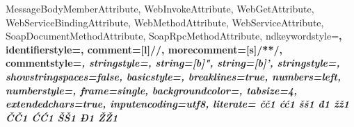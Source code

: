 {{        MessageBodyMemberAttribute, WebInvokeAttribute, WebGetAttribute, WebServiceBindingAttribute,
        WebMethodAttribute, WebServiceAttribute, SoapDocumentMethodAttribute, SoapRpcMethodAttribute},
    ndkeywordstyle=\color{magenta}\bfseries,
    identifierstyle=\color{black},
    comment=[l]{//},
    morecomment=[s]{/*}{*/},
    commentstyle=\color{gray}\itshape,
    stringstyle=\color{red},
    string=[b]",
    string=[b]',
    stringstyle=\color{red},
    showstringspaces=false,
    basicstyle=\ttfamily\small,
    breaklines=true,
    numbers=left,
    numberstyle=\tiny\color{gray},
    frame=single,
    backgroundcolor=\color{lightgray!20},
    tabsize=4,
    extendedchars=true,
    inputencoding=utf8,
    literate=
        {č}{{\v{c}}}1
        {ć}{{\'c}}1
        {š}{{\v{s}}}1
        {đ}{{\dj}}1
        {ž}{{\v{z}}}1
        {Č}{{\v{C}}}1
        {Ć}{{\'C}}1
        {Š}{{\v{S}}}1
        {Đ}{{\DJ}}1
        {Ž}{{\v{Z}}}1
}

\lstset{language=CSharp}

\graphicspath{{figures/}}

\newcommand{\maketitlepage}{
    \begin{titlepage}
        \centering
        \vspace*{2cm}
        
        {\LARGE \textbf{Fakultet tehničkih nauka} \par}
        \vspace{0.5cm}
        {\large Novi Sad \par}
        
        \vfill
        
        {\Huge \textbf{Udruženje za udomljavanje životinja} \par}
        \vspace{0.5cm}
        {\large Sistemska analiza i modeliranje \par}
        
        \vfill
        
        {\large Predmetni projekat \par}
        \vspace{2cm}
        {\large Prof. dr. Gordana Milosavljević \par}
        
        \vfill
        
        {\large Novi Sad, \today \par}
        
    \end{titlepage}
    \newpage
    \setcounter{page}{1}
}

